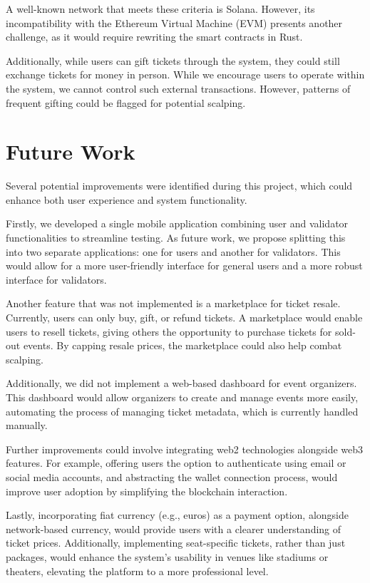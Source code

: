 A well-known network that meets these criteria is Solana. However, its
incompatibility with the Ethereum Virtual Machine (EVM) presents another
challenge, as it would require rewriting the smart contracts in Rust.

Additionally, while users can gift tickets through the system, they could still
exchange tickets for money in person. While we encourage users to operate
within the system, we cannot control such external transactions. However,
patterns of frequent gifting could be flagged for potential scalping.

\section{Future Work}
\label{sec:future_work}

Several potential improvements were identified during this project, which could
enhance both user experience and system functionality.

Firstly, we developed a single mobile application combining user and validator
functionalities to streamline testing. As future work, we propose splitting
this into two separate applications: one for users and another for validators.
This would allow for a more user-friendly interface for general users and a
more robust interface for validators.

Another feature that was not implemented is a marketplace for ticket resale.
Currently, users can only buy, gift, or refund tickets. A marketplace would
enable users to resell tickets, giving others the opportunity to purchase
tickets for sold-out events. By capping resale prices, the marketplace could
also help combat scalping.

Additionally, we did not implement a web-based dashboard for event organizers.
This dashboard would allow organizers to create and manage events more easily,
automating the process of managing ticket metadata, which is currently handled
manually.

Further improvements could involve integrating web2 technologies alongside web3
features. For example, offering users the option to authenticate using email or
social media accounts, and abstracting the wallet connection process, would
improve user adoption by simplifying the blockchain interaction.

Lastly, incorporating fiat currency (e.g., euros) as a payment option,
alongside network-based currency, would provide users with a clearer
understanding of ticket prices. Additionally, implementing seat-specific
tickets, rather than just packages, would enhance the system's usability in
venues like stadiums or theaters, elevating the platform to a more professional
level.
